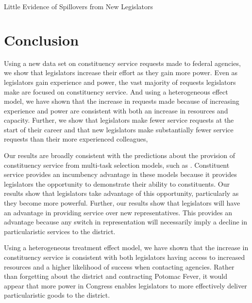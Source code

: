 \documentclass[12pt]{article}
\begin{document}
   

\begin{table}[hbt!]
\caption{Little Evidence of Spillovers from New Legislators} \label{t:spill1}

\begin{minipage}{\textwidth}
\begin{center}

\end{center}
\end{minipage}
\end{table}


\section{Conclusion} \label{s:conclude}

Using a new data set on constituency service requests made to federal agencies, we show that legislators increase their effort as they gain more power. Even as legislators gain experience and power, the vast majority of requests legislators make are focused on constituency service. And using a heterogeneous effect model, we have shown that the increase in requests made because of increasing experience and power are consistent with both an increase in resources and capacity. Further, we show that legislators make fewer service requests at the start of their career and that new legislators make substantially fewer service requests than their more experienced colleagues,  

Our results are broadly consistent with the predictions about the provision of constituency service from multi-task selection models, such as \cite{AshworthBuenodeMesquita2006}. Constituent service provides an incumbency advantage in these models because it provides legislators the opportunity to demonstrate their ability to constituents. Our results show that legislators take advantage of this opportunity, particularly as they become more powerful. Further, our results show that legislators will have an advantage in providing service over new representatives. This provides an advantage because any switch in representation will necessarily imply a decline in particularistic services to the district. 

Using a heterogeneous treatment effect model, we have shown that the increase in constituency service is consistent with both legislators having access to increased resources and a higher likelihood of success when contacting agencies. Rather than forgetting about the district and contracting Potomac Fever, it would appear that more power in Congress enables legislators to more effectively deliver particularistic goods to the district.  
\end{document}
